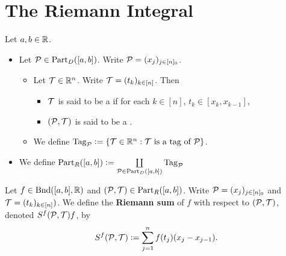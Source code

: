 \documentclass{book}
\begin{document}
	
	
	
	
	
	
	
	
	
	
	
	
	
	
	
	
	
	
	
	
	
	
	
	
	
	
	
	
	
	
	
	
	
	
	
	
	
	
	
	
	
	
	
	
	
	
	
	\newpage
	\section{The Riemann Integral}
	
	\begin{defn}  
		Let $a,b \in \mathbb{R}$. 
		\begin{itemize}
			\item Let $\mathcal{P} \in \text{Part}_D([a,b])$. Write $\mathcal{P} = (x_j)_{j \in [n]_0}$.
			\begin{itemize}
				\item Let $\mathcal{T} \in \mathbb{R}^n$. Write $\mathcal{T} = (t_k)_{k \in [n]}$. Then
				\begin{itemize}
					\item $\mathcal{T}$ is said to be a  if for each $k \in [n]$, $t_k \in [x_k, x_{k-1}]$,
					\item $(\mathcal{P}, \mathcal{T})$ is said to be a .
				\end{itemize}
				\item We define $\text{Tag}_{\mathcal{P}} \vcentcolon= \{\mathcal{T} \in \mathbb{R}^n: \text{$\mathcal{T}$ is a tag of $\mathcal{P}$}\}$.
			\end{itemize}
			\item We define $\text{Part}_R([a,b]) \vcentcolon= \coprod\limits_{\mathcal{P} \in \text{Part}_D([a,b])} \text{Tag}_{\mathcal{P}}$
		\end{itemize}
	\end{defn}
	
	\begin{defn}  
		Let $f \in \text{Bnd}([a,b], \mathbb{R})$ and $(\mathcal{P}, \mathcal{T}) \in \text{Part}_R([a,b])$. Write $\mathcal{P} = (x_j)_{j \in [n]_0}$ and $\mathcal{T} = (t_k)_{k \in [n]})$. We define the \textbf{Riemann sum} of $f$ with respect to $(\mathcal{P}, \mathcal{T})$, denoted $S^f(\mathcal{P}, \mathcal{T}) f$, by 
		$$S^f(\mathcal{P}, \mathcal{T}) \vcentcolon= \sum\limits_{j=1}^n f(t_j) (x_j - x_{j-1}).$$ 
	\end{defn}
	
\end{document}
